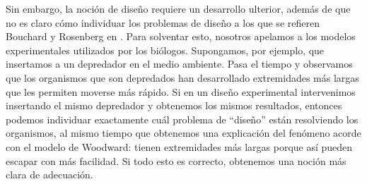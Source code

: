 Sin embargo, la noción de diseño requiere un desarrollo ulterior, además de que no es claro cómo individuar los problemas de diseño a los que se refieren Bouchard y Rosenberg en \citeyear{Bouchard2004}. Para solventar esto, nosotros apelamos a los modelos experimentales utilizados por los biólogos. Supongamos, por ejemplo, que insertamos a un depredador en el medio ambiente. Pasa el tiempo y observamos que los organismos que son depredados han desarrollado extremidades más largas que les permiten moverse más rápido. Si en un diseño experimental intervenimos insertando el mismo depredador y obtenemos los mismos resultados, entonces podemos individuar exactamente cuál problema de ``diseño'' están resolviendo los organismos, al mismo tiempo que obtenemos una explicación del fenómeno acorde con el modelo de Woodward: tienen extremidades más largas porque así pueden escapar con más facilidad. Si todo esto es correcto, obtenemos una noción más clara de adecuación.


